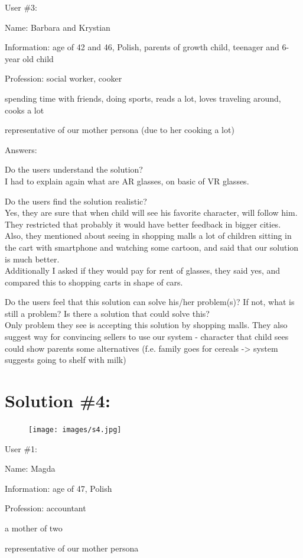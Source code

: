 \documentclass[a4paper,10pt,oneside]{scrreprt}
\begin{document}
User \#3:
\begin{compactitem}
	\item Name: Barbara and Krystian
	\item Information: age of 42 and 46, Polish, parents of growth child, teenager and 6-year old child
	\item Profession: social worker, cooker
	\item spending time with friends, doing sports, reads a lot, loves traveling around, cooks a lot  
	\item representative of our mother persona (due to her cooking a lot)
\end{compactitem}
\bigskip

Answers:
\begin{compactitem}
	\item Do the users understand the solution?\\
	I had to explain again what are AR glasses, on basic of VR glasses.\\

	\item Do the users find the solution realistic?\\
	Yes, they are sure that when child will see his favorite character, will follow him. They restricted that probably it would have better feedback in bigger cities.\\
	Also, they mentioned about seeing in shopping malls a lot of children sitting in the cart with smartphone and watching some cartoon, and said that our solution is much better.\\
	Additionally I asked if they would pay for rent of glasses, they said yes, and compared this to shopping carts in shape of cars.\\

	\item Do the users feel that this solution can solve his/her problem(s)? If not, what is still
	a problem? Is there a solution that could solve this?\\
	Only problem they see is accepting this solution by shopping malls. They also suggest way for convincing sellers to use our system - character that child sees could show parents some alternatives (f.e. family goes for cereals -> system suggests going to shelf with milk)\\
\end{compactitem}
\bigskip

\clearpage
\section{Solution \#4:}
\begin{figure}[h]
	\centering
	\texttt{[image: images/s4.jpg]}
\end{figure}
User \#1:
\begin{compactitem}
	\item Name: Magda
	\item Information: age of 47, Polish
	\item Profession: accountant 
	\item a mother of two
	\item representative of our mother persona 
\end{compactitem}
\bigskip
\end{document}
